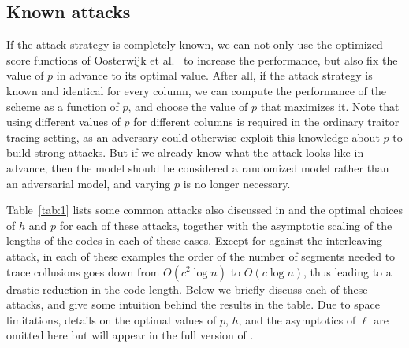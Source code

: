 \documentclass[10pt,a4paper,twocolumn]{article}
\begin{document}
\subsection{Known attacks}

If the attack strategy is completely known, we can not only use the optimized score functions of Oosterwijk et al.~\cite{oosterwijk13} to increase the performance, but also fix the value of $p$ in advance to its optimal value. After all, if the attack strategy is known and identical for every column, we can compute the performance of the scheme as a function of $p$, and choose the value of $p$ that maximizes it. Note that using different values of $p$ for different columns is required in the ordinary traitor tracing setting, as an adversary could otherwise exploit this knowledge about $p$ to build strong attacks. But if we already know what the attack looks like in advance, then the model should be considered a randomized model rather than an adversarial model, and varying $p$ is no longer necessary.

Table~\ref{tab:1} lists some common attacks also discussed in \cite{oosterwijk13} and the optimal choices of $h$ and $p$ for each of these attacks, together with the asymptotic scaling of the lengths of the codes in each of these cases. Except for against the interleaving attack, in each of these examples the order of the number of segments needed to trace collusions goes down from $O(c^2 \log n)$ to $O(c \log n)$, thus leading to a drastic reduction in the code length. Below we briefly discuss each of these attacks, and give some intuition behind the results in the table. Due to space limitations, details on the optimal values of $p$, $h$, and the asymptotics of $\ell$ are omitted here but will appear in the full version of \cite{laarhoven13allerton}.
\end{document}
